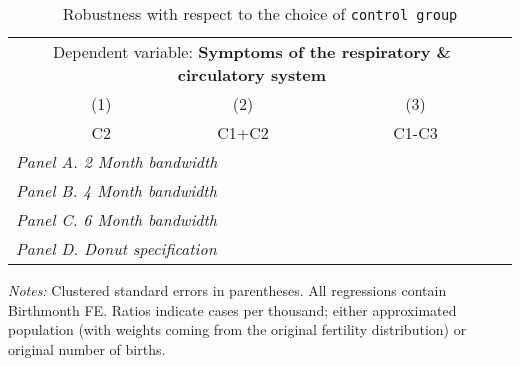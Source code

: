  \begin{table}[H] \begin{threeparttable} \centering \caption{Robustness with respect to the choice of \texttt{control group}} {\def\sym#1{\ifmmode^{#1}\else\(^{#1}\)\fi} \begin{tabular}{l*{4}{c}} \toprule \multicolumn{4}{c}{Dependent variable: \textbf{Symptoms of the respiratory \& circulatory system}} \\ \cmidrule(lr){2-4}
            &\multicolumn{1}{c}{(1)}&\multicolumn{1}{c}{(2)}&\multicolumn{1}{c}{(3)}\\
            &\multicolumn{1}{c}{C2}&\multicolumn{1}{c}{C1+C2}&\multicolumn{1}{c}{C1-C3}\\
\midrule
 \multicolumn{4}{l}{\emph{Panel A. 2 Month bandwidth}} \\    \midrule\multicolumn{4}{l}{\emph{Panel B. 4 Month bandwidth}} \\    \midrule\multicolumn{4}{l}{\emph{Panel C. 6 Month bandwidth}} \\    \midrule\multicolumn{4}{l}{\emph{Panel D. Donut specification}} \\    
\bottomrule \end{tabular} } \begin{tablenotes} \item \scriptsize \emph{Notes:} Clustered standard errors in parentheses. All regressions contain Birthmonth FE. Ratios indicate cases per thousand; either approximated population (with weights coming from the original fertility distribution) or original number of births. \end{tablenotes} \end{threeparttable} \end{table} 
